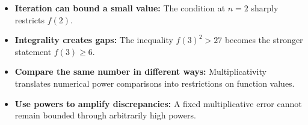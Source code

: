 \begin{takeaways}
\begin{itemize}
\item \textbf{Iteration can bound a small value:} The condition at \(n=2\) sharply restricts \(f(2)\).
\item \textbf{Integrality creates gaps:} The inequality \(f(3)^2>27\) becomes the stronger statement \(f(3)\ge6\).
\item \textbf{Compare the same number in different ways:} Multiplicativity translates numerical power comparisons into restrictions on function values.
\item \textbf{Use powers to amplify discrepancies:} A fixed multiplicative error cannot remain bounded through arbitrarily high powers.
\end{itemize}
\end{takeaways}
